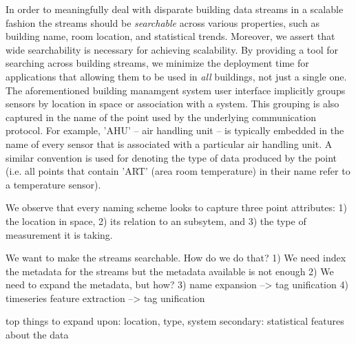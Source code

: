 In order to meaningfully deal with disparate building data streams in a scalable 
fashion the streams should be \emph{searchable} across various properties, such
as building name, room location, and statistical trends.  Moreover, we
assert that wide searchability is necessary for achieving scalability.  By providing a tool for
searching across building streams, we minimize the deployment time for applications that 
allowing them to be used in \emph{all} buildings, not just a single one.  The aforementioned 
building manamgent system user interface implicitly groups sensors by location in space
or association with a system.  This grouping is also captured in the name of the point used by
the underlying communication protocol.  For example, 'AHU' -- air handling unit -- is typically
embedded in the name of every sensor that is associated with a particular air handling unit.
A similar convention is used for denoting the type of data produced by the point (i.e. all points
that contain 'ART' (area room temperature)  in their name refer to a temperature sensor).

We observe that every naming scheme looks to capture three point attributes: 
1) the location in space, 2) its relation to an subsytem, and 3) the type of 
measurement it is taking.  

We want to make the streams searchable.  How do we do that?
1) We need index the metadata for the streams but the metadata available is not enough
2) We need to expand the metadata, but how?
3) name expansion --> tag unification
4) timeseries feature extraction --> tag unification

top things to expand upon:  location, type, system
secondary: statistical features about the data
 
